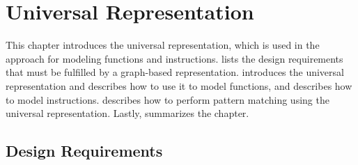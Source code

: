 %

\chapter{Universal Representation}

This chapter introduces the \gls{universal representation}, which is used in the
approach for modeling \glspl{function} and \glspl{instruction}.
%
 lists the design requirements that must
be fulfilled by a graph-based representation.
%
 introduces the \gls{universal representation}
and describes how to use it to model \glspl{function}, and
 describes how to model \glspl{instruction}.
%
 describes how to perform \gls{pattern
  matching} using the \gls{universal representation}.
%
Lastly,  summarizes the chapter.


\section{Design Requirements}


